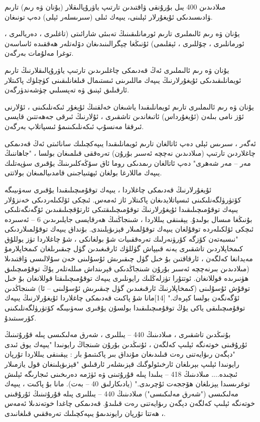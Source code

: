 \documentclass[a4paper]{article}
\begin{document}
\begin{flushright}
مىلادىدىن 400 يىل بۇرۇنقى ۋاقتىدىن تارتىپ ياۋرۇپالىقلار (يۇنان ۋە رىم) تارىم ۋادىسىدىكى ئۇيغۇرلار ئېلىنى، يىپەك ئىلى (سىرىسلەر ئېلى) دەپ تونىغان.

يۇنان ۋە رىم ئالىملىرى تارىم ئورمانلىقىنىڭ تەبىئى شارائىتى (تاغلىرى ، دەريالىرى ، ئورمانلىرى ، چۆللىرى ، ئېقلىمى) ئۇنىڭغا چېگرالىنىدىغان دۆلەتلەر ھەققىدە ئاساسەن توغرا مەلۇمات بەرگەن.

يۇنان ۋە رىم ئالىملىرى ئەڭ قەدىمكى چاغلىرىدىن تارتىپ ياۋرۇپالىقلارنىڭ تارىم ئويمانلىقىدىكى ئۇيغۇرلارنىڭ يىپەك ماللىرىنى ئىستىمال قىلغانلىقىنى كۈچلۈك پاكىتلار ئارقىلىق ئېنىق ۋە تەپسىلىي چۈشەندۈرگەن.

يۇنان ۋە رىم ئالىملىرى تارىم ئويمانلىقىدا ياشىغان خەلقنىڭ ئۇيغۇر ئىكەنلىكىنى ، ئۇلارنى ئۆز نامى بىلەن (ئۇيغۇرداس) ئاتىغاندىن تاشقىرى ، ئۇلارنىڭ ئىرقى جەھەتتىن قايسى ئىرققا مەنسۇپ ئىكەنلىكىنىمۇ ئىسپاتلاپ بەرگەن.

ئەگەر ، سىرىس ئېلى دەپ ئاتالغان تارىم ئويمانلىقىدا يىپەكچىلىك سانائىتى ئەڭ قەدىمكى چاغلاردىن تارتىپ (مىلادىدىن نەچچە ئەسىر بۇرۇن) تەرەققى قىلمىغان بولسا ، "جاھاننىڭ مەر – مەر شەھرى" دەپ ئاتالغان رىمدىكى روما ئاق سۆڭەكلىرىنىڭ يۇقىرى سۈپەتلىك يىپەك ماللارغا بولغان ئېھتىياجىنى قامدىيالمىغان بولاتتى.

ئۇيغۇرلارنىڭ قەدىمكى چاغلاردا ، يىپەك توقۇمىچىلىقىدا يۇقىرى سەۋىيىگە كۆتۈرۈلگەنلىكىنى ئىسپاتلايدىغان پاكىتلار ئاز ئەمەس. ئىچكى ئۆلكىلەردىكى خەنزۇلار يىپەك توقۇمىچىلىقىدا ئۇيغۇرلارنىڭ توقۇمىچىلىقتىكى ئارتۇقچىلىقىدىن ئۆگەنگەنلىكى بۇنىڭغا مىسال بولىدۇ. يېقىنقى يىللاردا ، شىنجاڭنىڭ ھەرقايسى جايلىرىدىن 6 – ئەسىردە ئىچكى ئۆلكىلەردە توقۇلغان يىپەك توقۇلمىلار قېزىۋېلىندى. بۇنداق يىپەك توقۇلمىلاردىكى "نىسبەتەن كۆزگە كۆرۈنەرلىك تەرەققىيات شۇ بولغانكى ، شۇ چاغلاردا تۈز يوللۇق كىمخاپلاردىن تاشقىرى يەنە قىيپاش گۈللۈك ئارقىغىدىن گۈل چىقىرىلغان كىمخاپلارمۇ مەيدانغا كەلگەن ، ئارقاقتىن بۇ خىل گۈل چىقىرىش ئۇسۇلىنى خەن سۇلالىسى ۋاقتىدىلا (مىلادىدىن بىرنەچچە ئەسىر بۇرۇن شىنجاڭدىكى قېرىنداش مىللەتلەر يۇڭ توقۇمىچىلىق ھۈنىرىدە قوللانغان. ئوتتۇرا تۈزلەڭلىك رايونلىرى يىپەك توقۇمىچىلىقتا قوللانغان بۇ خىل توقۇش ئۇسۇلىنى (كىمخاپلارنىڭ ئارقىغىدىن گۈل چىقىرىش ئۇسۇلىنى – ئا) شىنجاڭدىن ئۆگەنگەن بولسا كېرەك." [14]مانا شۇ پاكىت قەدىمكى چاغلاردا ئۇيغۇرلارنىڭ يىپەك توقۇمىچىلىقى ياكى يۇڭ توقۇمىچىلىقىدا بولسۇن يۇقىرى سەۋىيىگە كۆتۈرۈلگەنلىكىنى كۆرسىتىدۇ.



بۇنىڭدىن تاشقىرى ، مىلادىنىڭ 440 – يىللىرى ، شەرق مەلىكىسى پىلە قۇرۇتىنىڭ ئۇرۇقىنى خوتەنگە ئېلىپ كەلگەن ، ئۇنىڭدىن بۇرۇن شىنجاڭ رايونىدا "يىپەك يوق ئىدى "دېگەن رىۋايەتنى رەت قىلىدىغان مۇنداق بىر پاكىتىمۇ بار : يېقىنقى يىللاردا تۇرپان رايونىدا ئېلىپ بېرىلغان ئارخىئولوگىك قېزىشلەر ئارقىلىق "قېزىۋېلىنغان قول يازمىلار ئىچىدە.... مىلادىنىڭ 418 – يىلىدا پىلە قۇرۇتىنى ۋە ئۈژمە دەرىخىنى ئىجارىگە ئېلىش توغرىسىدا يېزىلغان ھۆججەت ئۇچرىدى." (يادىكارلىق 40 – بەت). مانا بۇ پاكىت ، يىپەك مەلىكىسى ("شەرق مەلىكىسى") مىلادىنىڭ 440 – يىللىرى پىلە قۇرۇتىنىڭ ئۇرۇقىنى خوتەنگە ئېلىپ كەلگەن دېگەن رىۋايەتنى رەت قىلىدۇ. قەدىمكى چاغدا خوتەندىلا ئەمەس ، ھەتتا تۇرپان رايوندىمۇ يىپەكچىلىك تەرەققىي قىلغانىدى.




\end{flushright}
\end{document}
